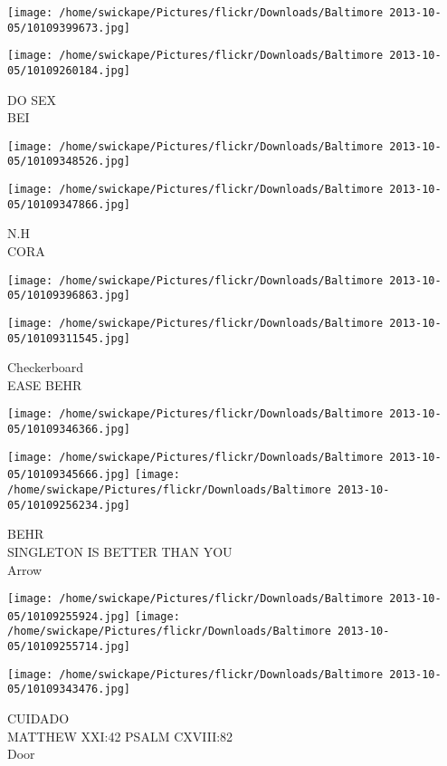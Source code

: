 \documentclass[10pt,letterpaper]{article}
\begin{document}
\texttt{[image: /home/swickape/Pictures/flickr/Downloads/Baltimore 2013-10-05/10109399673.jpg]}

\vspace{0.25in}
\texttt{[image: /home/swickape/Pictures/flickr/Downloads/Baltimore 2013-10-05/10109260184.jpg]}

DO SEX\\
BEI
\pagebreak

\texttt{[image: /home/swickape/Pictures/flickr/Downloads/Baltimore 2013-10-05/10109348526.jpg]}

\vspace{0.25in}
\texttt{[image: /home/swickape/Pictures/flickr/Downloads/Baltimore 2013-10-05/10109347866.jpg]}

N.H\\
CORA
\pagebreak

\texttt{[image: /home/swickape/Pictures/flickr/Downloads/Baltimore 2013-10-05/10109396863.jpg]}

\vspace{0.25in}
\texttt{[image: /home/swickape/Pictures/flickr/Downloads/Baltimore 2013-10-05/10109311545.jpg]}

Checkerboard\\
EASE BEHR
\pagebreak

\texttt{[image: /home/swickape/Pictures/flickr/Downloads/Baltimore 2013-10-05/10109346366.jpg]}

\vspace{0.25in}
\texttt{[image: /home/swickape/Pictures/flickr/Downloads/Baltimore 2013-10-05/10109345666.jpg]}
\texttt{[image: /home/swickape/Pictures/flickr/Downloads/Baltimore 2013-10-05/10109256234.jpg]}

BEHR\\
SINGLETON IS BETTER THAN YOU\\
Arrow
\pagebreak

\texttt{[image: /home/swickape/Pictures/flickr/Downloads/Baltimore 2013-10-05/10109255924.jpg]}
\texttt{[image: /home/swickape/Pictures/flickr/Downloads/Baltimore 2013-10-05/10109255714.jpg]}

\texttt{[image: /home/swickape/Pictures/flickr/Downloads/Baltimore 2013-10-05/10109343476.jpg]}

CUIDADO\\
MATTHEW XXI:42 PSALM CXVIII:82\\
Door
\pagebreak
\end{document}
